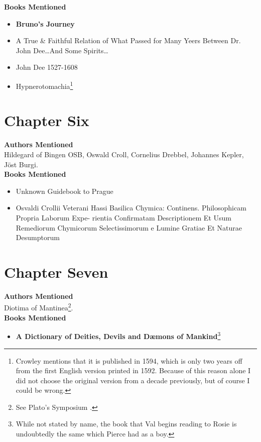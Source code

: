 \documentclass[12pt,makeidx]{extreport}
\begin{document}
\hspace{-1.5em}\textbf{Books Mentioned}
\begin{itemize}
\item \textbf{Bruno’s Journey} \cite{Craft1931}
\item A True \& Faithful Relation of What Passed for Many Yeers Between Dr. John Dee\ldots And Some
Spirits\ldots \cite{Dee1659}
\item John Dee 1527-1608 \cite{Smith1909}
\item Hypnerotomachia\footnote{Crowley mentions that it is published in 1594, which is only two years off from the first English version printed in 1592. Because of this reason alone I did not choose the original version from a decade previously, but of course I could be wrong.} \cite{Colonna1592}
\end{itemize}

\section{Chapter Six}
\textbf{Authors Mentioned}\\
Hildegard of Bingen OSB, Oswald Croll, Cornelius Drebbel, Johannes Kepler, Jöst Burgi.
\\

\hspace{-1.5em}\textbf{Books Mentioned}
\begin{itemize}
\item Unknown Guidebook to Prague \cite{UnknownPre1967}
\item Osvaldi Crollii Veterani Hassi Basilica Chymica: Continens. Philosophicam Propria Laborum Expe-
rientia Confirmatam Descriptionem Et Usum Remediorum Chymicorum Selectissimorum e Lumine
Gratiae Et Naturae Desumptorum \cite{Croll1611}
\end{itemize}

\section{Chapter Seven}
\textbf{Authors Mentioned}\\
Diotima of Mantinea\footnote{See Plato’s Symposium \cite{Plato1925}.}.
\\

\hspace{-1.5em}\textbf{Books Mentioned}
\begin{itemize}
\item \textbf{A Dictionary of Deities, Devils and Dæmons of Mankind}\footnote{While not stated by name, the book that Val begins reading to Rosie is undoubtedly the same which Pierce had as a boy.} \cite{St.Phalle}
\end{itemize}
\end{document}
